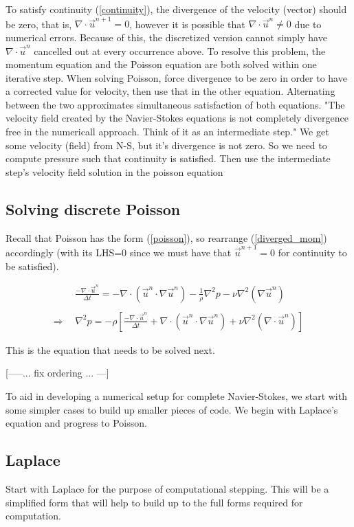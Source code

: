 \documentclass[11pt]{article}
\begin{document}
{To satisfy continuity (\ref{continuity}), the divergence of the velocity (vector) should
be zero, that is, $\nabla \cdot \vec{u}^{n+1}=0$, however it is
possible that $\nabla \cdot \vec{u}^n \neq 0$ due to numerical errors. Because of this,
the discretized version cannot simply have $\nabla \cdot \vec{u}^n$ cancelled out at
every occurrence above. To resolve this problem, the momentum equation and the Poisson
equation are both solved within one iterative step. When solving Poisson, force divergence
to be zero in order to have a corrected value for velocity, then use that in the other
equation. Alternating between the two approximates simultaneous satisfaction of both
equations. "The velocity field created by the Navier-Stokes equations is not completely
divergence free in the numericall approach. Think of it as an intermediate step."
We get some velocity (field) from N-S, but it's divergence is not zero. So we need to
compute pressure such that continuity is satisfied. Then use the intermediate step's velocity
field solution in the poisson equation

\subsection{Solving discrete Poisson}
Recall that Poisson has the form (\ref{poisson}), so rearrange (\ref{diverged_mom})
accordingly (with its LHS=0 since we must have that $\vec{u}^{n+1} = 0$ for continuity
to be satisfied).

\begin{align}
& \frac{- \nabla \cdot \vec{u}^n}{\Delta t}
	= - \nabla \cdot (\vec{u}^n \cdot \nabla \vec{u}^n)
	  - \frac{1}{\rho} \nabla^2 p
	  - \nu \nabla^2(\nabla \vec{u}^n)
														  \nonumber \\ \nonumber \\
\Rightarrow ~~&
\nabla^2 p = -\rho \left[
					\frac{ - \nabla \cdot \vec{u}^n}{\Delta t}
					+ \nabla \cdot (\vec{u}^n \cdot \nabla \vec{u}^n)
					+ \nu \nabla^2(\nabla \cdot \vec{u}^n)			\right]
\label{discrete_poisson}
\end{align}

This is the equation that needs to be solved next.

[-----... fix ordering ... ---]

To aid in developing a numerical setup for complete Navier-Stokes, we start with some simpler
cases to build up smaller pieces of code. We begin with Laplace's equation and progress to
Poisson.

\subsection{Laplace}
Start with Laplace for the purpose of computational stepping. This will be a simplified form
that will help to build up to the full forms required for computation.

}
\end{document}
